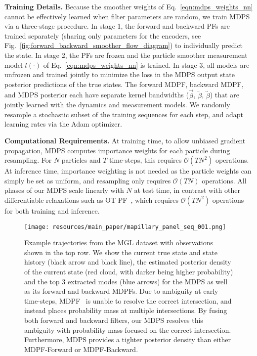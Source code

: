     
    
    \textbf{Training Details.} Because the smoother weights of Eq.~\eqref{eqn:mdps_weights_nn} cannot be effectively learned when filter parameters are random, we train MDPS via a three-stage procedure.  In stage 1, the forward and backward PFs are trained separately (sharing only parameters for the encoders, see Fig.~\ref{fig:forward_backward_smoother_flow_diagram}) to individually predict the state. In stage 2, the PFs are frozen and the particle smoother measurement model $l(\cdot)$ of Eq.~\eqref{eqn:mdps_weights_nn} is trained. In stage 3, all models are unfrozen and trained jointly to minimize the loss in the MDPS output state posterior predictions of the true states. The forward MDPF, backward MDPF, and MDPS posterior each have separate kernel bandwidths ($\overrightarrow{\beta}$, $\overleftarrow{\beta}$, $\overleftrightarrow{\beta}$) %
    that are jointly learned with the dynamics and measurement models.  We randomly resample a stochastic subset of the training sequences for each step, and adapt learning rates via the Adam \cite{DBLP:journals/corr/KingmaB14} optimizer. %

    \textbf{Computational Requirements.} At training time, to allow unbiased gradient propagation, MDPS computes importance weights for each particle during resampling.  For $N$ particles and $T$ time-steps, this requires $\mathcal{O}(TN^2)$ operations.  At inference time, importance weighting is not needed as the particle weights can simply be set as uniform, and resampling only requires $\mathcal{O}(TN)$ operations.  All phases of our MDPS scale linearly with $N$ at test time, in contrast with other differentiable relaxations such as OT-PF~\cite{pmlr-v139-corenflos21a_optimal_transport}, which requires $\mathcal{O}(TN^2)$ operations for both training and inference.

        \begin{figure}[t]
            \centering
            \texttt{[image: resources/main\_paper/mapillary\_panel\_seq\_001.png]}
            \vskip -0.08in
            \caption{\small{Example trajectories from the MGL dataset with observations shown in the top row. We show the current true state and state history (black arrow and black line), the estimated posterior density of the current state (red cloud, with darker being higher probability) and the top 3 extracted modes (blue arrows) for the MDPS as well as its forward and backward MDPFs. Due to ambiguity at early time-steps, MDPF~\cite{younis2023mdpf} is unable to resolve the correct intersection, and instead places probability mass at multiple intersections. By fusing both forward and backward filters, our MDPS resolves this ambiguity with probability mass focused on the correct intersection.  Furthermore, MDPS provides a tighter posterior density than either MDPF-Forward or MDPF-Backward.}}
            \label{fig:mapillary_panel}
            \vskip -0.1in
        \end{figure}


